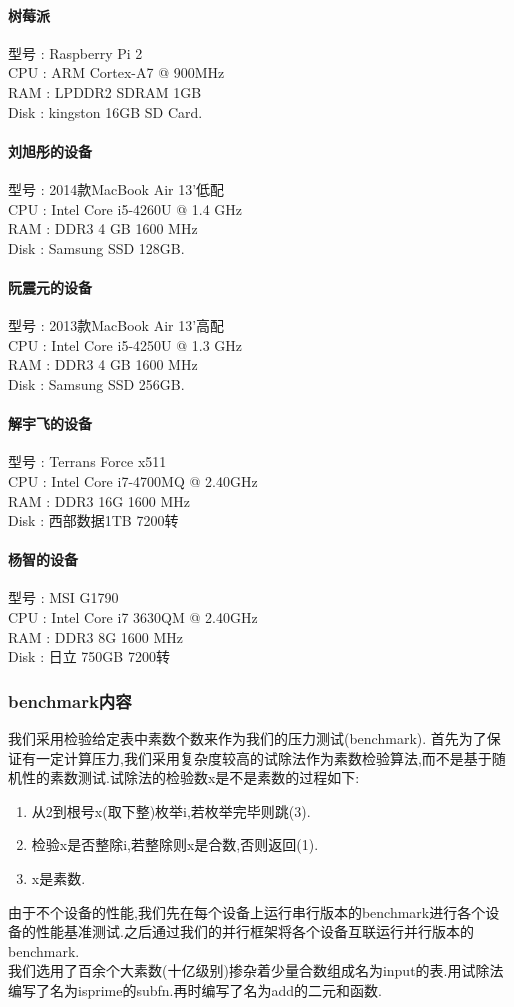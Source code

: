 \documentclass[paper=a4]{ctexart} %
\numberwithin{equation}{section} %
\numberwithin{figure}{section} %
\numberwithin{table}{section} %
\newcommand{\n}{\\\indent}
\begin{document}
\paragraph{树莓派}
型号 : Raspberry Pi 2\n
CPU : ARM Cortex-A7 @ 900MHz\n
RAM : LPDDR2 SDRAM 1GB\n
Disk : kingston 16GB SD Card.

\paragraph{刘旭彤的设备}
型号 : 2014款MacBook Air 13'低配\n
CPU : Intel Core i5-4260U @ 1.4 GHz \n
RAM : DDR3 4 GB 1600 MHz\n
Disk : Samsung SSD 128GB.

\paragraph{阮震元的设备}
型号 : 2013款MacBook Air 13'高配\n
CPU : Intel Core i5-4250U @ 1.3 GHz \n
RAM : DDR3 4 GB 1600 MHz\n
Disk : Samsung SSD 256GB.

\paragraph{解宇飞的设备}
型号 : Terrans Force x511 \n
CPU : Intel Core i7-4700MQ @ 2.40GHz\n
RAM : DDR3 16G 1600 MHz\n
Disk : 西部数据1TB 7200转\n

\paragraph{杨智的设备}
型号 : MSI G1790\n
CPU : Intel Core i7 3630QM @ 2.40GHz\n
RAM : DDR3 8G 1600 MHz\n
Disk : 日立 750GB 7200转\n

\subsubsection{benchmark内容}

我们采用检验给定表中素数个数来作为我们的压力测试(benchmark). 首先为了保证有一定计算压力,我们采用复杂度较高的试除法作为素数检验算法,而不是基于随机性的素数测试.试除法的检验数x是不是素数的过程如下:

\begin{enumerate}
\item 从2到根号x(取下整)枚举i,若枚举完毕则跳(3).
\item 检验x是否整除i,若整除则x是合数,否则返回(1).
\item x是素数.
\end{enumerate}

由于不个设备的性能,我们先在每个设备上运行串行版本的benchmark进行各个设备的性能基准测试.之后通过我们的并行框架将各个设备互联运行并行版本的benchmark. \n
我们选用了百余个大素数(十亿级别)掺杂着少量合数组成名为input的表.用试除法编写了名为isprime的subfn.再时编写了名为add的二元和函数.
\end{document}
